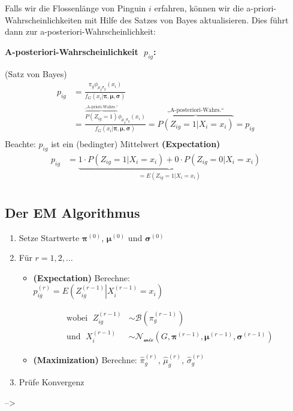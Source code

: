 \documentclass[
  ngerman,
]{book}
\begin{document}
Falls wir die Flossenlänge von Pinguin \(i\) erfahren, können wir die a-priori-Wahrscheinlichkeiten mit Hilfe des Satzes von Bayes aktualisieren. Dies führt dann zur a-posteriori-Wahrscheinlichkeit:

\textbf{A-posteriori-Wahrscheinlichkeit \(\;p_{ig}\):}

(Satz von Bayes)
\begin{align*}
p_{ig}
&=\frac{\pi_g\phi_{\mu_g\sigma_g}(x_i)}{f_G(x_i|\boldsymbol{\pi},\boldsymbol{\mu},\boldsymbol{\sigma})}\\[2ex]
&=\frac{\overbrace{P(Z_{ig}=1)}^{\text{„A-priori-Wahrs.“}}\phi_{\mu_g\sigma_g}(x_i)}{f_G(x_i|\boldsymbol{\pi},\boldsymbol{\mu},\boldsymbol{\sigma})}=\overbrace{P(Z_{ig}=1|X_i=x_i)}^{\text{„A-posteriori-Wahrs.“}}=p_{ig}\\
\end{align*}
Beachte: \(p_{ig}\) ist ein (bedingter) Mittelwert {\textbf{(Expectation)}}
\begin{align*}
p_{ig}&=\underbrace{1\cdot P(Z_{ig}=1|X_i=x_i)+0\cdot P(Z_{ig}=0|X_i=x_i)}_{=E(Z_{ig}=1|X_i=x_i)}\\
\end{align*}

\hypertarget{der-em-algorithmus}{%
\subsection*{\texorpdfstring{Der {E}{M} Algorithmus}{Der EM Algorithmus}}\label{der-em-algorithmus}}

\begin{enumerate}
\def\labelenumi{\arabic{enumi}.}
\item
  Setze Startwerte \(\boldsymbol{\pi}^{(0)}\), \(\boldsymbol{\mu}^{(0)}\) und \(\boldsymbol{\sigma}^{(0)}\)
\item
  Für \(r=1,2,\dots\)

  \begin{itemize}
  \item
    {\textbf{(Expectation)} } Berechne:\\

    \(p_{ig}^{(r)}=E\left(Z_{ig}^{(r-1)}\left|X_i^{(r-1)}=x_i\right.\right)\)

    \begin{align*}
     \text{wobei }\;Z_{ig}^{(r-1)}&\sim\mathcal{B}\left(\pi_g^{(r-1)}\right)\\
     \text{und }\;X_i^{(r-1)}&\sim \mathcal{N}_{\mathcal{mix}}(G,\boldsymbol{\pi}^{(r-1)},\boldsymbol{\mu}^{(r-1)},\boldsymbol{\sigma}^{(r-1)})
     \end{align*}
  \item
    {\textbf{(Maximization)}} Berechne: \(\hat\pi_g^{(r)}\), \(\hat\mu_g^{(r)}\), \(\hat\sigma_g^{(r)}\)
  \end{itemize}
\item
  Prüfe Konvergenz
\end{enumerate}

--\textgreater{}

  
\end{document}
